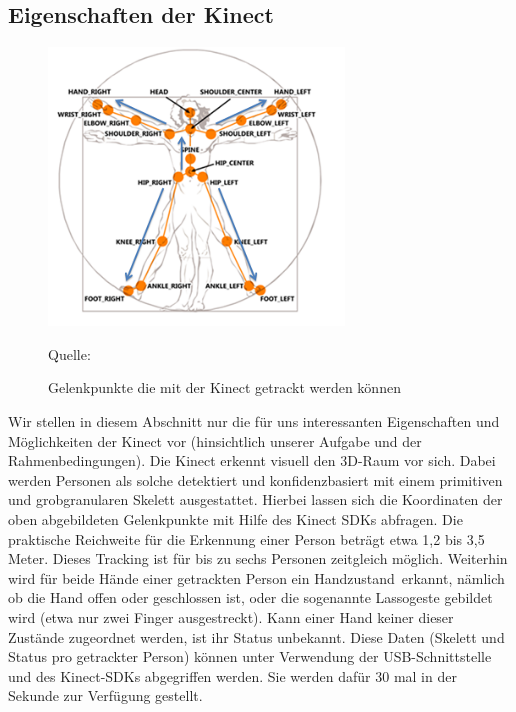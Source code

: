 \subsection{Eigenschaften der Kinect} 
\begin{figure}[htbp] 
  \centering
     \includegraphics[width=0.7\textwidth]{pictures/skeletal.png}
     
  \caption{Gelenkpunkte die mit der Kinect getrackt werden können}
  \footnotesize Quelle: \cite{tracking}
  \label{fig:Bild1}
\end{figure}

	Wir stellen in diesem Abschnitt nur die für uns interessanten Eigenschaften und Möglichkeiten der Kinect vor (hinsichtlich unserer Aufgabe und der Rahmenbedingungen). Die Kinect erkennt visuell den 3D-Raum vor sich. Dabei werden Personen als solche detektiert und konfidenzbasiert mit einem primitiven und grobgranularen Skelett ausgestattet. Hierbei lassen sich die Koordinaten der oben abgebildeten Gelenkpunkte mit Hilfe des Kinect SDKs abfragen. Die praktische Reichweite für die Erkennung einer Person beträgt etwa 1,2 bis 3,5 Meter. Dieses Tracking ist für bis zu sechs Personen zeitgleich möglich. Weiterhin wird für beide Hände einer getrackten Person ein \glqq Handzustand\grqq~erkannt, nämlich ob die Hand offen oder geschlossen ist, oder die sogenannte Lassogeste gebildet wird (etwa nur zwei Finger ausgestreckt). Kann einer Hand keiner dieser Zustände zugeordnet werden, ist ihr Status unbekannt. Diese Daten (Skelett und Status pro getrackter Person) können unter Verwendung der USB-Schnittstelle und des Kinect-SDKs abgegriffen werden. Sie werden dafür 30 mal in der Sekunde zur Verfügung gestellt.